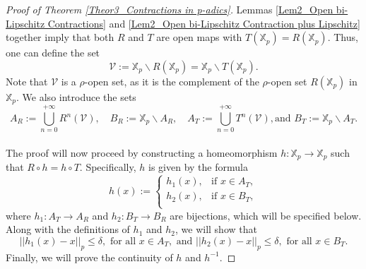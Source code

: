 \documentclass[10pt,a4paper]{amsart}
\begin{document}
\begin{proof}[Proof of Theorem \ref{Theor3_Contractions in p-adics}]
		Lemmas \ref{Lem2_Open bi-Lipschitz Contractions} and \ref{Lem2_Open bi-Lipschitz Contraction plus Lipschitz} together imply that both $R$ and $T$ are open maps with  $ T \left(  \mathbb{X}_{p}  \right)  = R \left(  \mathbb{X}_{p}  \right)  $. Thus, one can define the set  
		\begin{equation}\label{Eq2_Domain of the Contraction}  
			\mathcal{V} :=    \mathbb{X}_{p} \backslash R \left(  \mathbb{X}_{p}  \right)    =   \mathbb{X}_{p} \backslash T \left(  \mathbb{X}_{p}  \right)  .
		\end{equation}
		Note that $\mathcal{V}$ is a $\rho$-open set, as it is the complement of the $\rho$-open set $R \left(  \mathbb{X}_{p}  \right) $ in $\mathbb{X}_{p}$. 
		We also introduce the sets 
		\begin{equation}\label{Eq2_Contraction Domain B}
			A_{R} :=   \bigcup_{n=0}^{+ \infty } R^{n} \left(  \mathcal{V}  \right) , \quad B_{R} :=   \mathbb{X}_{p} \backslash A_{R}, \quad A_{T} :=   \bigcup_{n=0}^{+ \infty } T^{n} \left(  \mathcal{V}  \right) ,   \text{and }   B_{T} :=   \mathbb{X}_{p} \backslash A_{T}.
		\end{equation}
		
		
		\paragraph{}
		
		The proof will now proceed by constructing a homeomorphism $h: \mathbb{X}_{p} \to \mathbb{X}_{p}$ such that $R \circ h = h \circ T$.  Specifically, $h$ is given by the formula 
		\begin{equation}\label{Eq3_Conjugation Fundamental Domains A and B}
			h \left(  x  \right)  :=   \begin{cases}
				h_{1} \left(  x  \right) ,  & \text{if } x \in A_{T},  \\ 
				h_{2} \left(  x  \right) ,   & \text{if } x \in B_{T},  \\  
			\end{cases}
		\end{equation}
		where $h_{1}: A_{T} \to A_{R}$ and $h_{2}: B_{T} \to B_{R}$ are bijections, which will be specified below. Along with the definitions of $h_{1}$ and $h_{2}$, we will show that 
		\begin{equation}\label{Eq3_Conjugation h delta close to Identity}
			\left| \left|  h_{1}(x) - x  \right|  \right|_{p}   \le   \delta,   \text{ for all } x \in A_{T}, \text{ and }    \left| \left|  h_{2}(x) - x  \right|  \right|_{p}   \le   \delta,   \text{ for all } x \in B_{T}. 
		\end{equation}
		Finally, we will prove the continuity of $h$ and $h^{-1}$. 
		

\end{proof}
\end{document}
